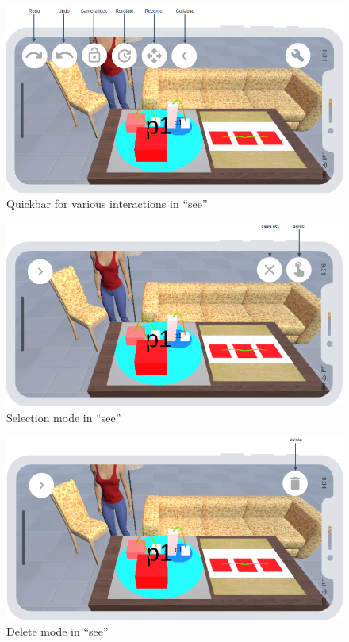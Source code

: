 \begin{figure}[htb]
    \centering
    \includegraphics[width=1\textwidth]{Concept/img/quickbar.png}
    \caption{Quickbar for various interactions in \enquote{\gls{see}}}\label{fig:quickbar}
\end{figure}

\begin{figure}[htb]
    \centering
    \includegraphics[width=1\textwidth]{Concept/img/menu1.png}
    \caption{Selection mode in \enquote{\gls{see}}}\label{fig:select}
\end{figure}

\begin{figure}[htb]
    \centering
    \includegraphics[width=1\textwidth]{Concept/img/menu2.png}
    \caption{Delete mode in \enquote{\gls{see}}}\label{fig:delete}
\end{figure}

